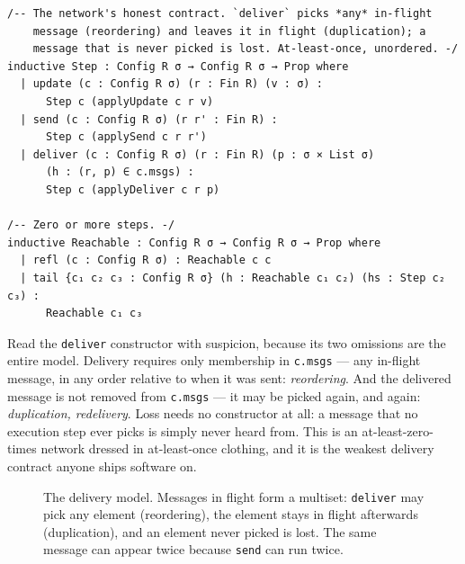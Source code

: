 \documentclass[12pt, a4paper, openright]{book}
\theoremstyle{thmstyle}
\theoremstyle{defstyle}
\newcommand{\lc}[1]{\texttt{#1}}
\begin{document}
\begin{verbatim}
/-- The network's honest contract. `deliver` picks *any* in-flight
    message (reordering) and leaves it in flight (duplication); a
    message that is never picked is lost. At-least-once, unordered. -/
inductive Step : Config R σ → Config R σ → Prop where
  | update (c : Config R σ) (r : Fin R) (v : σ) :
      Step c (applyUpdate c r v)
  | send (c : Config R σ) (r r' : Fin R) :
      Step c (applySend c r r')
  | deliver (c : Config R σ) (r : Fin R) (p : σ × List σ)
      (h : (r, p) ∈ c.msgs) :
      Step c (applyDeliver c r p)

/-- Zero or more steps. -/
inductive Reachable : Config R σ → Config R σ → Prop where
  | refl (c : Config R σ) : Reachable c c
  | tail {c₁ c₂ c₃ : Config R σ} (h : Reachable c₁ c₂) (hs : Step c₂ c₃) :
      Reachable c₁ c₃
\end{verbatim}

Read the \lc{deliver} constructor with suspicion, because its two
omissions are the entire model. Delivery requires only membership in
\lc{c.msgs} --- any in-flight message, in any order relative to when it
was sent: \emph{reordering}. And the delivered message is not removed
from \lc{c.msgs} --- it may be picked again, and again: \emph{duplication,
redelivery}. Loss needs no constructor at all: a message that no
execution step ever picks is simply never heard from. This is an
at-least-zero-times network dressed in at-least-once clothing, and it is
the weakest delivery contract anyone ships software on.

\begin{figure}[h]
  \centering
  \caption{The delivery model. Messages in flight form a multiset:
    \texttt{deliver} may pick any element (reordering), the element stays
    in flight afterwards (duplication), and an element never picked is
    lost. The same message can appear twice because \texttt{send} can run
    twice.}
\end{figure}
\end{document}
